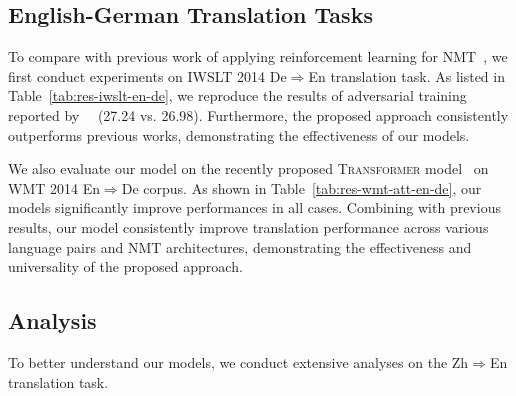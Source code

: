 \documentclass[letterpaper]{article} \usepackage{aaai19}  \usepackage{times}  \usepackage{helvet}  \usepackage{courier}  \usepackage{url}  \usepackage{graphicx}  \frenchspacing  \setlength{\pdfpagewidth}{8.5in}  \setlength{\pdfpageheight}{11in}  \usepackage{amsmath}
\begin{document}
\subsection{English-German Translation Tasks}

To compare with previous work of applying reinforcement learning for NMT~\cite{Ranzato:2016:ICLR,bahdanau2016actor,Wiseman:2016:EMNLP,wu2017adversarial}, we first conduct experiments on IWSLT 2014 De$\Rightarrow$En translation task. As listed in Table~\ref{tab:res-iwslt-en-de}, we reproduce the results of adversarial training reported by~\citeauthor{wu2017adversarial}~ (27.24 vs. 26.98). Furthermore, the proposed approach consistently outperforms previous works, demonstrating the effectiveness of our models.


We also evaluate our model on the recently proposed \textsc{Transformer} model~\cite{vaswani2017attention} on WMT 2014 En$\Rightarrow$De corpus. As shown in Table~\ref{tab:res-wmt-att-en-de}, our models significantly improve performances in all cases.
Combining with previous results, our model consistently improve translation performance across various language pairs and NMT architectures, demonstrating the effectiveness and universality of the proposed approach.



\iffalse
the WMT14 benchmarks for both German-English and English-German.
As shown in Table \ref{tab:res-wmt-en-de}, our model (\emph{i.e.,}\xspace ``{+{\bf \em D}$_{\textsc{Rnn}}$+{\bf \em O}$_{\textsc{Cdr}}$}'') improves performances in all cases,
demonstrating the efficiency and universality of the proposed approach across language pairs.
In addition, \textsc{Cdr} score consistently outperforms \textsc{Bleu} score even the latter uses 25 samples, proving the superiority of the proposed metric.
The best performance we achieve is also comparable with the reported results on the same data. 

Table~\ref{tab:res-iwslt-en-de} lists the result on the IWSLT data. We reproduced the result reported in~\cite{wu2017adversarial} (27.24 vs. 26.98). The proposed adequacy learning approach consistently outperforms previously reported results.
\fi



\subsection{Analysis}

To better understand our models, we conduct extensive analyses on the Zh$\Rightarrow$En translation task. 
\end{document}
